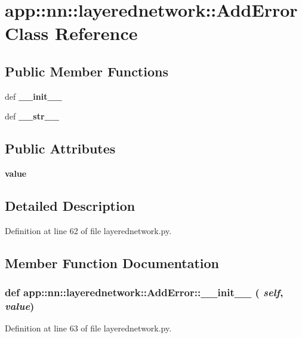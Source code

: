 \section{app::nn::layerednetwork::AddError Class Reference}
\label{classapp_1_1nn_1_1layerednetwork_1_1AddError}
\subsection*{Public Member Functions}
\begin{CompactItemize}
\item 
def {\bf \_\-\_\-init\_\-\_\-}
\item 
def {\bf \_\-\_\-str\_\-\_\-}
\end{CompactItemize}
\subsection*{Public Attributes}
\begin{CompactItemize}
\item 
{\bf value}
\end{CompactItemize}


\subsection{Detailed Description}


Definition at line 62 of file layerednetwork.py.

\subsection{Member Function Documentation}
\subsubsection{\setlength{\rightskip}{0pt plus 5cm}def app::nn::layerednetwork::AddError::\_\-\_\-init\_\-\_\- ( {\em self},  {\em value})}\label{classapp_1_1nn_1_1layerednetwork_1_1AddError_6ce035ed414594e4a57af140b0f4eee8}




Definition at line 63 of file layerednetwork.py.
